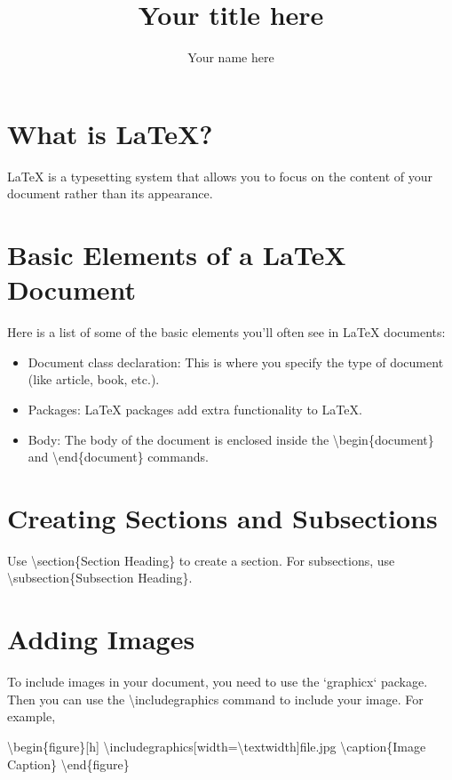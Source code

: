 \documentclass[11pt]{article}
\title{Your title here}
\author{Your name here}
\begin{document}
\maketitle
\frontmatter


\makefrontmatter


\mainmatter
\section{What is \LaTeX{}?}
\LaTeX{} is a typesetting system that allows you to focus on the content of your document rather than its appearance.

\section{Basic Elements of a \LaTeX{} Document}
Here is a list of some of the basic elements you'll often see in \LaTeX{} documents:

\begin{itemize}
  \item Document class declaration: This is where you specify the type of document (like article, book, etc.).
  \item Packages: \LaTeX{} packages add extra functionality to \LaTeX{}.
  \item Body: The body of the document is enclosed inside the \textbackslash begin\{document\} and \textbackslash end\{document\} commands.
\end{itemize}

\section{Creating Sections and Subsections}
Use \textbackslash section\{Section Heading\} to create a section. For subsections, use \textbackslash subsection\{Subsection Heading\}.

\section{Adding Images}
To include images in your document, you need to use the `graphicx` package. Then you can use the \textbackslash includegraphics command to include your image. For example,

\textbackslash begin\{figure\}[h]
\textbackslash includegraphics[width=\textbackslash textwidth]{file.jpg}
\textbackslash caption\{Image Caption\}
\textbackslash end\{figure\}
\end{document}
